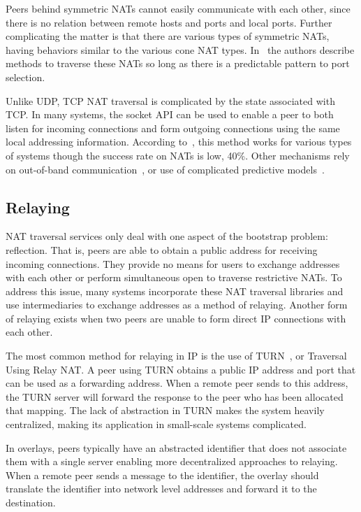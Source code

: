 \documentclass[conference]{IEEEtran}
\begin{document}
Peers behind symmetric NATs cannot easily communicate with each other, since
there is no relation between remote hosts and ports and local ports.  Further
complicating the matter is that there are various types of symmetric NATs,
having behaviors similar to the various cone NAT types. In~\cite{ice} the
authors describe methods to traverse these NATs so long as there is a
predictable pattern to port selection.  

Unlike UDP, TCP NAT traversal is complicated by the state associated with TCP.
In many systems, the socket API can be used to enable a peer to both listen for
incoming connections and form outgoing connections using the same local
addressing information.  According to~\cite{ice-tcp}, this method works for
various types of systems though the success rate on NATs is low, 40\%.  Other
mechanisms rely on out-of-band communication~\cite{pvc}, or use of complicated
predictive models~\cite{tcp-hole-punching}.

\subsection{Relaying}
\label{relay}

NAT traversal services only deal with one aspect of the bootstrap problem:
reflection.  That is, peers are able to obtain a public address for receiving
incoming connections.  They provide no means for users to exchange addresses
with each other or perform simultaneous open to traverse restrictive NATs.  To
address this issue, many systems incorporate these NAT traversal libraries and
use intermediaries to exchange addresses as a method of relaying.  Another form
of relaying exists when two peers are unable to form direct IP connections with
each other.

The most common method for relaying in IP is the use of TURN~\cite{turn}, or
Traversal Using Relay NAT.  A peer using TURN obtains a public IP address and
port that can be used as a forwarding address.  When a remote peer sends to
this address, the TURN server will forward the response to the peer who has
been allocated that mapping.  The lack of abstraction in TURN makes the system
heavily centralized, making its application in small-scale systems complicated.  

In overlays, peers typically have an abstracted identifier that does not
associate them with a single server enabling more decentralized approaches to
relaying.  When a remote peer sends a message to the identifier, the overlay
should translate the identifier into network level addresses and forward it to
the destination.
\end{document}
